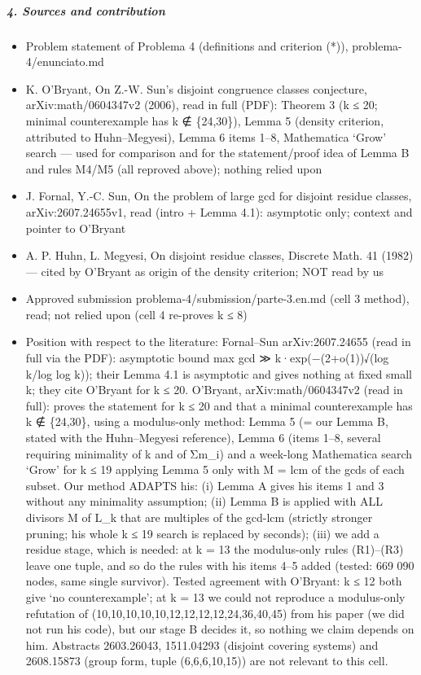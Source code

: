 \documentclass[11pt,a4paper]{article}
\providecommand{\tightlist}{\setlength{\itemsep}{0pt}\setlength{\parskip}{0pt}}
\begin{document}
\subparagraph{4. Sources and
contribution}\label{sources-and-contribution}

\begin{itemize}
\tightlist
\item
  Problem statement of Problema 4 (definitions and criterion (*)),
  problema-4/enunciato.md
\item
  K. O'Bryant, On Z.-W. Sun's disjoint congruence classes conjecture,
  arXiv:math/0604347v2 (2006), read in full (PDF): Theorem 3 (k ≤ 20;
  minimal counterexample has k ∉ \{24,30\}), Lemma 5 (density criterion,
  attributed to Huhn--Megyesi), Lemma 6 items 1--8, Mathematica `Grow'
  search --- used for comparison and for the statement/proof idea of
  Lemma B and rules M4/M5 (all reproved above); nothing relied upon
\item
  J. Fornal, Y.-C. Sun, On the problem of large gcd for disjoint residue
  classes, arXiv:2607.24655v1, read (intro + Lemma 4.1): asymptotic
  only; context and pointer to O'Bryant
\item
  A. P. Huhn, L. Megyesi, On disjoint residue classes, Discrete Math. 41
  (1982) --- cited by O'Bryant as origin of the density criterion; NOT
  read by us
\item
  Approved submission problema-4/submission/parte-3.en.md (cell 3
  method), read; not relied upon (cell 4 re-proves k ≤ 8)
\item
  Position with respect to the literature: Fornal--Sun arXiv:2607.24655
  (read in full via the PDF): asymptotic bound max gcd ≫
  k·exp(−(2+o(1))√(log k/log log k)); their Lemma 4.1 is asymptotic and
  gives nothing at fixed small k; they cite O'Bryant for k ≤ 20.
  O'Bryant, arXiv:math/0604347v2 (read in full): proves the statement
  for k ≤ 20 and that a minimal counterexample has k ∉ \{24,30\}, using
  a modulus-only method: Lemma 5 (= our Lemma B, stated with the
  Huhn--Megyesi reference), Lemma 6 (items 1--8, several requiring
  minimality of k and of Σm\_i) and a week-long Mathematica search
  `Grow' for k ≤ 19 applying Lemma 5 only with M = lcm of the gcds of
  each subset. Our method ADAPTS his: (i) Lemma A gives his items 1 and
  3 without any minimality assumption; (ii) Lemma B is applied with ALL
  divisors M of L\_k that are multiples of the gcd-lcm (strictly
  stronger pruning; his whole k ≤ 19 search is replaced by seconds);
  (iii) we add a residue stage, which is needed: at k = 13 the
  modulus-only rules (R1)--(R3) leave one tuple, and so do the rules
  with his items 4--5 added (tested: 669 090 nodes, same single
  survivor). Tested agreement with O'Bryant: k ≤ 12 both give `no
  counterexample'; at k = 13 we could not reproduce a modulus-only
  refutation of (10,10,10,10,10,12,12,12,12,24,36,40,45) from his paper
  (we did not run his code), but our stage B decides it, so nothing we
  claim depends on him. Abstracts 2603.26043, 1511.04293 (disjoint
  covering systems) and 2608.15873 (group form, tuple (6,6,6,10,15)) are
  not relevant to this cell.
\end{itemize}
\end{document}
